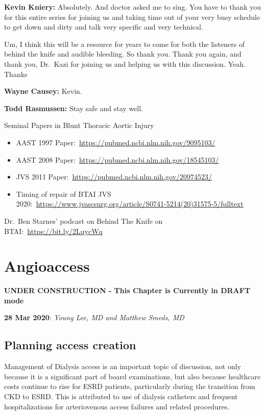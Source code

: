 \documentclass[
]{book}
\begin{document}
\textbf{Kevin Kniery:} Absolutely. And doctor asked me to sing. You have to
thank you for this entire series for joining us and taking time out of
your very busy schedule to get down and dirty and talk very specific and
very technical.

Um, I think this will be a resource for years to come for both the
listeners of behind the knife and audible bleeding. So thank you. Thank
you again, and thank you, Dr.~Kazi for joining us and helping us with
this discussion. Yeah. Thanks

\textbf{Wayne Causey:} Kevin.

\textbf{Todd Rasmussen:} Stay safe and stay well.

Seminal Papers in Blunt Thoracic Aortic Injury

\begin{itemize}
\item
  AAST 1997 Paper:~\url{https://pubmed.ncbi.nlm.nih.gov/9095103/}
\item
  AAST 2008 Paper:~\url{https://pubmed.ncbi.nlm.nih.gov/18545103/}
\item
  JVS 2011 Paper:~\url{https://pubmed.ncbi.nlm.nih.gov/20974523/}
\item
  Timing of repair of BTAI JVS
  2020:~\url{https://www.jvascsurg.org/article/S0741-5214(20)31575-5/fulltext}
\end{itemize}

Dr.~Ben Starnes' podcast on Behind The Knife on
BTAI:~\url{https://bit.ly/2LuycWq}

\hypertarget{angioaccess}{%
\chapter{Angioaccess}\label{angioaccess}}

\textbf{UNDER CONSTRUCTION - This Chapter is Currently in DRAFT mode}

\textbf{28 Mar 2020}: \emph{Young Lee, MD and Matthew Smeds, MD}

\hypertarget{planning-access-creation}{%
\section{Planning access creation}\label{planning-access-creation}}

Management of Dialysis access is an important topic of discussion, not
only because it is a significant part of board examinations, but also
because healthcare costs continue to rise for ESRD patients,
particularly during the transition from CKD to ESRD. This is attributed
to use of dialysis catheters and frequent hospitalizations for
arteriovenous access failures and related procedures.
\end{document}
